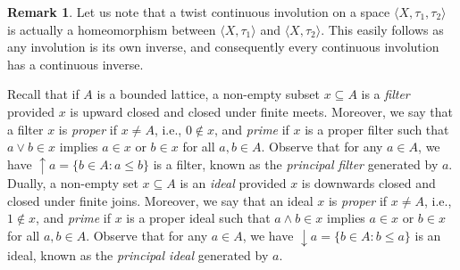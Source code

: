 \documentclass{amsart}
\theoremstyle{plain}
\theoremstyle{definition}
\newtheorem{remark}[theorem]{Remark}
\begin{document}

\begin{remark}
Let us note that a twist continuous involution on a space $\langle X, \tau_1, \tau_2 \rangle$ is actually a homeomorphism between $\langle X, \tau_1 \rangle$ and $\langle X, \tau_2 \rangle$. This easily follows as any involution is its own inverse, and consequently every continuous involution has a continuous inverse.
\end{remark}




Recall that if $A$ is a bounded lattice, a non-empty subset $x\subseteq A$ is a \emph{filter} provided $x$ is upward closed and closed under finite meets. Moreover, we say that a filter $x$ is \emph{proper} if $x\not=A$, i.e., $0\not\in x$, and \emph{prime} if $x$ is a proper filter such that $a\vee b\in x$ implies $a\in x$ or $b\in x$ for all $a,b\in A$. Observe that for any $a\in A$, we have ${\uparrow}a=\{b\in A:a\leq b\}$ is a filter, known as the \emph{principal filter} generated by $a$. Dually, a non-empty set $x\subseteq A$ is an \emph{ideal} provided $x$ is downwards closed and closed under finite joins. Moreover, we say that an ideal $x$ is \emph{proper} if $x\not=A$, i.e., $1\not\in x$, and \emph{prime} if $x$ is a proper ideal such that $a\wedge b\in x$ implies $a\in x$ or $b\in x$ for all $a,b\in A$. Observe that for any $a\in A$, we have ${\downarrow}a=\{b\in A:b\leq a\}$ is an ideal, known as the \emph{principal ideal} generated by $a$. 
\end{document}

